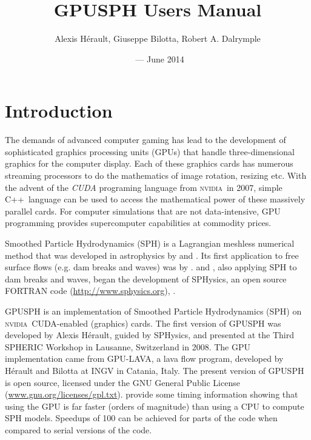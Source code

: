 \documentclass[12pt]{memoir}
\title{GPUSPH Users Manual}
\author{Alexis Hérault, Giuseppe Bilotta, Robert A. Dalrymple}
\date{\currentver\ --- June 2014}
\newcommand{\nvidia}{\textsc{nvidia}}
\newcommand{\cpp}{{\sffamily C\ttfamily++}}
\begin{document}
\maketitle
\tableofcontents

\chapter{Introduction}


The demands of advanced computer gaming has lead to the development of
sophisticated graphics processing units (GPUs) that handle
three-dimensional graphics for the computer display. Each of these
graphics cards has numerous streaming processors to do the mathematics
of image rotation, resizing etc. With the advent of the {\em CUDA}
programing language from \nvidia\ in 2007, simple \cpp\ language can be used
to access the mathematical power of these massively parallel cards. For
computer simulations that are not data-intensive, GPU programming
provides supercomputer capabilities at commodity prices.

Smoothed Particle Hydrodynamics (SPH) is a Lagrangian meshless numerical
method that was developed in astrophysics by \cite{Lucy:1977} and
\cite{GingMon:1977}. Its first application to free surface flows (e.g.
dam breaks and waves) was by \cite{Monaghan:1994}.
\cite{Gomez-Gesteira:2004} and \cite{DalrympleRogers:2006}, also
applying SPH to dam breaks and waves, began the development of SPHysics,
an open source FORTRAN code (\url{http://www.sphysics.org}),
\cite{Gesteiraetal:2008}.

GPUSPH is an implementation of Smoothed Particle Hydrodynamics (SPH) on
\nvidia\ CUDA-enabled (graphics) cards. The first version of GPUSPH was
developed by Alexis Hérault, guided by SPHysics, and presented at the
Third SPHERIC Workshop in Lausanne, Switzerland in 2008. The GPU
implementation came from GPU-LAVA, a lava flow program, developed by
Hérault and Bilotta at INGV in Catania, Italy. The present version of
GPUSPH is open source, licensed under the GNU General Public License
(\url{www.gnu.org/licenses/gpl.txt}). \cite{Heraultetal:2010} provide
some timing information showing that using the GPU is far faster (orders
of magnitude) than using a CPU to compute SPH models. Speedups of 100
can be achieved for parts of the code when compared to serial versions
of the code.
\end{document}
